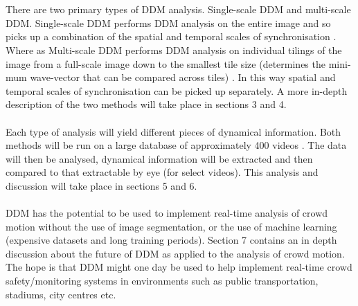 \documentclass[11pt]{article}
\begin{document}
\\\\
There are two primary types of DDM analysis. Single-scale DDM and multi-scale DDM. Single-scale DDM performs DDM analysis on the entire image and so picks up a combination of the spatial and temporal scales of synchronisation \cite{ddm2}. Where as Multi-scale DDM performs DDM analysis on individual tilings of the image from a full-scale image down to the smallest tile size (determines the mini-mum wave-vector that can be compared across tiles) \cite{ddm2}. In this way spatial and temporal scales of synchronisation can be picked up separately. A more in-depth description of the two methods will take place in sections 3 and 4.  
\\\\
Each type of analysis will yield different pieces of dynamical information. Both methods will be run on a large database of approximately 400 videos \cite{crowdMotionDB}. The data will then be analysed, dynamical information will be extracted and then compared to that extractable by eye (for select videos). This analysis and discussion will take place in sections 5 and 6.
\\\\
DDM has the potential to be used to implement real-time analysis of crowd motion without the use of image segmentation, or the use of machine learning (expensive datasets and long training periods). Section 7 contains an in depth discussion about the future of DDM as applied to the analysis of crowd motion. The hope is that DDM might one day be used to help implement real-time crowd safety/monitoring systems in environments such as public transportation, stadiums, city centres etc.
\end{document}
